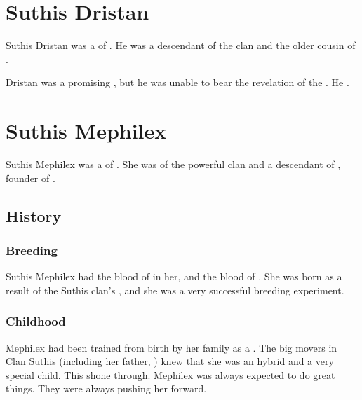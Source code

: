 \section{Suthis Dristan}
Suthis Dristan was a \rethyax \scatha of . 
He was a descendant of the  clan and the older cousin of . 

Dristan was a promising \rethyax, but he was unable to bear the revelation of the . 
He .















\section{Suthis Mephilex}
Suthis Mephilex was a \rethyax \scatha of . 
She was of the powerful  clan and a descendant of , founder of \Yormis. 









\subsection{History}





\subsubsection{Breeding}
Suthis Mephilex had the blood of \ophidians in her, and the blood of \xss.
She was born as a result of the Suthis clan's , and she was a very successful breeding experiment.





\subsubsection{Childhood}
Mephilex had been trained from birth by her family as a \rethyax. 
The big movers in Clan Suthis (including her father, ) knew that she was an \ophidian hybrid and a very special child.
This shone through.
Mephilex was always expected to do great things.
They were always pushing her forward. 

